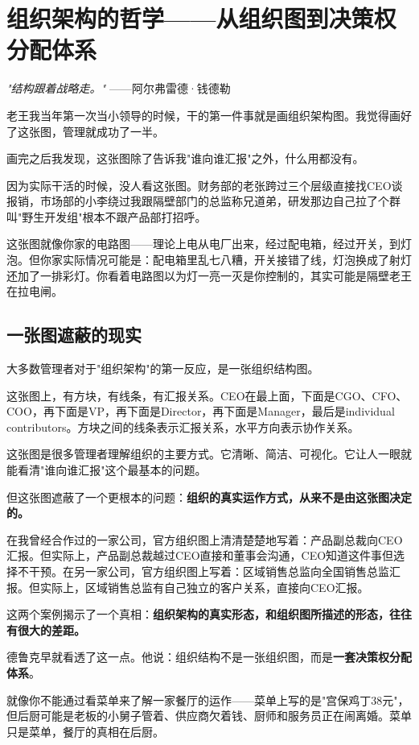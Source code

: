 \chapter{组织架构的哲学——从组织图到决策权分配体系}


\textit{"结构跟着战略走。"}
——阿尔弗雷德·钱德勒


老王我当年第一次当小领导的时候，干的第一件事就是画组织架构图。我觉得画好了这张图，管理就成功了一半。

画完之后我发现，这张图除了告诉我"谁向谁汇报"之外，什么用都没有。

因为实际干活的时候，没人看这张图。财务部的老张跨过三个层级直接找CEO谈报销，市场部的小李绕过我跟隔壁部门的总监称兄道弟，研发那边自己拉了个群叫"野生开发组"根本不跟产品部打招呼。

这张图就像你家的电路图——理论上电从电厂出来，经过配电箱，经过开关，到灯泡。但你家实际情况可能是：配电箱里乱七八糟，开关接错了线，灯泡换成了射灯还加了一排彩灯。你看着电路图以为灯一亮一灭是你控制的，其实可能是隔壁老王在拉电闸。

\section{一张图遮蔽的现实}


大多数管理者对于"组织架构"的第一反应，是一张组织结构图。

这张图上，有方块，有线条，有汇报关系。CEO在最上面，下面是CGO、CFO、COO，再下面是VP，再下面是Director，再下面是Manager，最后是individual contributors。方块之间的线条表示汇报关系，水平方向表示协作关系。

这张图是很多管理者理解组织的主要方式。它清晰、简洁、可视化。它让人一眼就能看清"谁向谁汇报"这个最基本的问题。

但这张图遮蔽了一个更根本的问题：\textbf{组织的真实运作方式，从来不是由这张图决定的。}

在我曾经合作过的一家公司，官方组织图上清清楚楚地写着：产品副总裁向CEO汇报。但实际上，产品副总裁越过CEO直接和董事会沟通，CEO知道这件事但选择不干预。在另一家公司，官方组织图上写着：区域销售总监向全国销售总监汇报。但实际上，区域销售总监有自己独立的客户关系，直接向CEO汇报。

这两个案例揭示了一个真相：\textbf{组织架构的真实形态，和组织图所描述的形态，往往有很大的差距。}

德鲁克早就看透了这一点。他说：组织结构不是一张组织图，而是\textbf{一套决策权分配体系}。

就像你不能通过看菜单来了解一家餐厅的运作——菜单上写的是"宫保鸡丁38元"，但后厨可能是老板的小舅子管着、供应商欠着钱、厨师和服务员正在闹离婚。菜单只是菜单，餐厅的真相在后厨。

